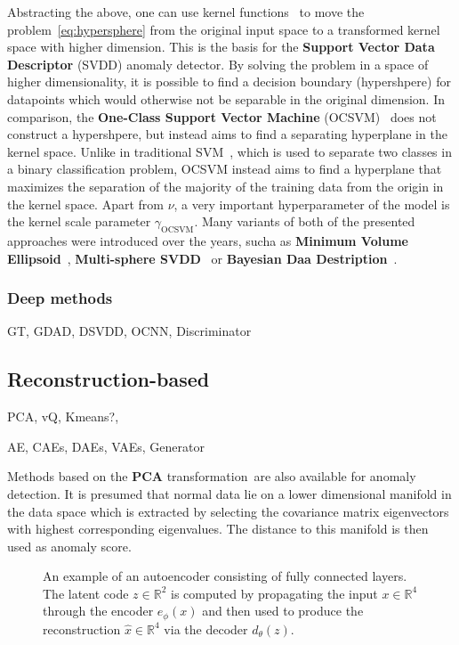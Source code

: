 Abstracting the above, one can use kernel functions~\cite{shawe2004kernel} to move the problem~\eqref{eq:hypersphere} from the original input space to a transformed kernel space with higher dimension. This is the basis for the \textbf{Support Vector Data Descriptor} (SVDD) anomaly detector. By solving the problem in a space of higher dimensionality, it is possible to find a decision boundary (hypershpere) for datapoints which would otherwise not be separable in the original dimension. In comparison, the \textbf{One-Class Support Vector Machine} (OCSVM)~\cite{scholkopf2001estimating} does not construct a hypershpere, but instead aims to find a separating hyperplane in the kernel space. Unlike in traditional SVM~\cite{cortes1995support}, which is used to separate two classes in a binary classification problem, OCSVM instead aims to find a hyperplane that maximizes the separation of the majority of the training data from the origin in the kernel space. Apart from $\nu$, a very important hyperparameter of the model is the kernel scale parameter $\gamma_{\text{OCSVM}}$. Many variants of both of the presented approaches were introduced over the years, sucha as \textbf{Minimum Volume Ellipsoid}~\cite{van2009minimum}, \textbf{Multi-sphere SVDD}~\cite{gornitz2017support} or \textbf{Bayesian Daa Destription}~\cite{ghasemi2012bayesian}.

\subsubsection{Deep methods}

GT, GDAD, DSVDD, OCNN, Discriminator


\subsection{Reconstruction-based}

PCA, vQ, Kmeans?, 

AE, CAEs, DAEs, VAEs, Generator

Methods based on the \textbf{PCA }transformation\,\cite{shyu2003novel,aggarwal2015outlier}\textbf{
}are also available for anomaly detection. It is presumed that normal
data lie on a lower dimensional manifold in the data space which is
extracted by selecting the covariance matrix eigenvectors with highest
corresponding eigenvalues. The distance to this manifold is then used
as anomaly score.


\begin{figure}
\begin{centering}

\par\end{centering}
\centering{}\caption{An example of an autoencoder consisting of fully connected layers.
The latent code $z\in\mathbb{R}^{2}$ is computed by propagating the
input $x\in\mathbb{R}^{4}$ through the encoder $e_{\phi}(x)$ and
then used to produce the reconstruction $\hat{x}\in\mathbb{R}^{4}$
via the decoder $d_{\theta}(z)$.}
\label{fig:ae}
\end{figure}


